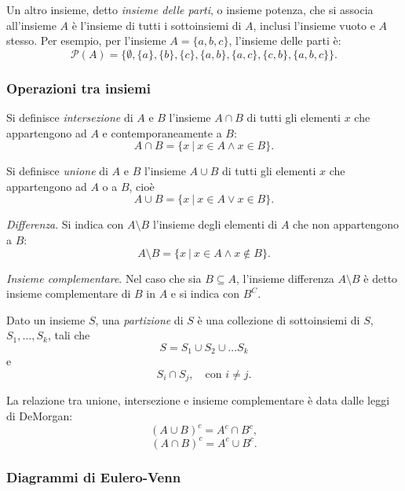 Un altro insieme, detto \emph{insieme delle parti}, o insieme potenza, che si associa all'insieme $A$ è l'insieme di tutti i sottoinsiemi di $A$, inclusi l'insieme vuoto e $A$ stesso. Per esempio, per l'insieme $A = \{a, b, c\}$, l'insieme delle parti è:
\[
\mathcal{P}(A) = \{
\emptyset, \{a\}, \{b\}, \{c\},
 \{a, b\}, \{a, c\}, \{c, b\},
 \{a, b, c\}
\}.
\]

\subsubsection*{Operazioni tra insiemi}

Si definisce \emph{intersezione} di $A$ e $B$ l'insieme $A \cap B$ di tutti gli elementi $x$ che appartengono ad $A$ e contemporaneamente a $B$:
\[
A \cap B = \{x ~\vert~ x \in A \land x \in B\}.
\]

Si definisce \emph{unione} di $A$ e $B$ l'insieme $A \cup B$ di tutti gli elementi $x$ che appartengono ad $A$ o a $B$, cioè
\[
A \cup B = \{x ~\vert~ x \in A \lor x \in B\}.
\]

\emph{Differenza}. Si indica con $A \setminus B$ l'insieme degli elementi di $A$ che non appartengono a $B$:
\[
A \setminus B = \{x ~\vert~ x \in A \land x \notin B\}.
\]

\emph{Insieme complementare}. Nel caso che sia $B \subseteq A$, l'insieme differenza $A \setminus B$ è detto insieme complementare di $B$ in $A$ e si indica con $B^C$.

Dato un insieme $S$, una \emph{partizione} di $S$ è una collezione di sottoinsiemi di $S$, $S_1, \dots, S_k$, tali che
\[
S = S_1 \cup S_2 \cup \dots S_k
\]
e
\[
 S_i \cap S_j, \quad \text{con~} i \neq j.
\]

La relazione tra unione, intersezione e insieme complementare è data dalle leggi di DeMorgan:
\[
(A \cup B)^c = A^c \cap B^c,
\]
\[
(A \cap B)^c = A^c \cup B^c.
\]


\subsubsection*{Diagrammi di Eulero-Venn}


